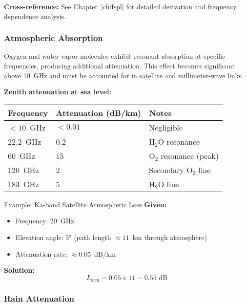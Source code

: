 \textbf{Cross-reference:} See Chapter~\ref{ch:fspl} for detailed derivation and frequency dependence analysis.

\subsubsection{Atmospheric Absorption}

Oxygen and water vapor molecules exhibit resonant absorption at specific frequencies, producing additional attenuation. This effect becomes significant above 10~GHz and must be accounted for in satellite and millimeter-wave links.

\textbf{Zenith attenuation at sea level:}

\begin{center}
\begin{tabular}{@{}lll@{}}
\toprule
Frequency & Attenuation (dB/km) & Notes \\
\midrule
$< 10$~GHz & $< 0.01$ & Negligible \\
22.2~GHz & 0.2 & H$_2$O resonance \\
60~GHz & 15 & O$_2$ resonance (peak) \\
120~GHz & 2 & Secondary O$_2$ line \\
183~GHz & 5 & H$_2$O line \\
\bottomrule
\end{tabular}
\end{center}

\begin{calloutbox}{Example: Ka-band Satellite Atmospheric Loss}
\textbf{Given:}
\begin{itemize}
\item Frequency: 20~GHz
\item Elevation angle: $5°$ (path length $\approx 11$~km through atmosphere)
\item Attenuation rate: $\approx 0.05$~dB/km
\end{itemize}

\textbf{Solution:}
\begin{equation*}
L_{\text{atm}} = 0.05 \times 11 = 0.55\text{~dB}
\end{equation*}
\end{calloutbox}

\subsubsection{Rain Attenuation}

